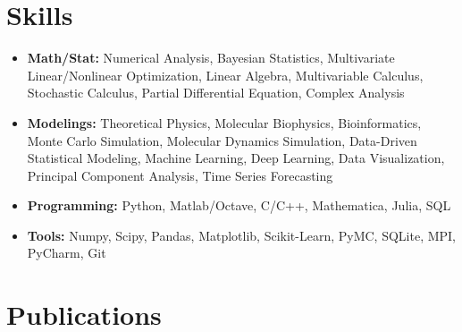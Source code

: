 \documentclass[11pt]{../yhlcv}
\begin{document}
\section*{Skills}
\begin{itemize}[leftmargin=*]\itemsep-0.1em
%
\item {\bf Math/Stat:}
Numerical Analysis, 
Bayesian Statistics, 
Multivariate Linear/Nonlinear Optimization, 
Linear Algebra, 
Multivariable Calculus,
Stochastic Calculus,
Partial Differential Equation, 
Complex Analysis %
\item{\bf Modelings:}
Theoretical Physics, Molecular Biophysics, Bioinformatics,
Monte Carlo Simulation, Molecular Dynamics Simulation, %
Data-Driven Statistical Modeling,
Machine Learning,
Deep Learning, %
Data Visualization, 
Principal Component Analysis, 
Time Series Forecasting
%
\item{\bf Programming:} 
Python, Matlab/Octave, C/C++, Mathematica, Julia, SQL
%
\item{\bf Tools:}
Numpy, Scipy, Pandas, Matplotlib, Scikit-Learn, PyMC, SQLite, MPI, PyCharm, Git
\end{itemize}

\section*{Publications}
\end{document}

